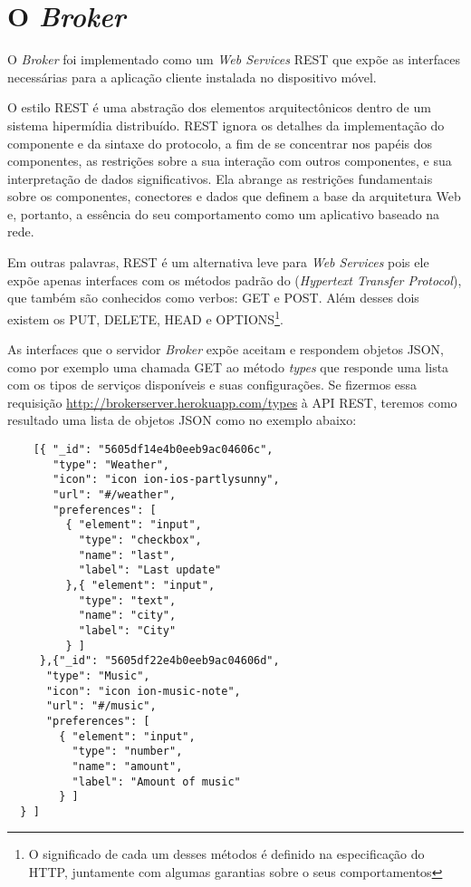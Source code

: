 \section{O \normalfont\itshape Broker}
O \textit{Broker} foi implementado como um \textit{Web Services} REST que expõe as interfaces necessárias para a aplicação cliente instalada no dispositivo móvel.
\begin{citacao}
O estilo REST é uma abstração dos elementos arquitectônicos dentro de um sistema hipermídia distribuído. REST ignora os detalhes da implementação do componente e da sintaxe do protocolo, a fim de se concentrar nos papéis dos componentes, as restrições sobre a sua interação com outros componentes, e sua interpretação de dados significativos. Ela abrange as restrições fundamentais sobre os componentes, conectores e dados que definem a base da arquitetura Web e, portanto, a essência do seu comportamento como um aplicativo baseado na rede. \cite{fielding2000architectural}
\end{citacao}
Em outras palavras, REST é um alternativa leve para \textit{Web Services} pois ele expõe apenas interfaces com os métodos padrão do  (\textit{Hypertext Transfer Protocol}), que também são conhecidos como verbos: GET e POST. Além desses dois existem os PUT, DELETE, HEAD e OPTIONS\footnote{O significado de cada um desses métodos é definido na especificação do HTTP, juntamente com algumas garantias sobre o seus comportamentos}.

As interfaces que o servidor \textit{Broker} expõe aceitam e respondem objetos JSON, como por exemplo uma chamada GET ao método \textit{types} que responde uma lista com os tipos de serviços disponíveis e suas configurações.
Se fizermos essa requisição \url{http://brokerserver.herokuapp.com/types} à API REST, teremos como resultado uma lista de objetos JSON como no exemplo abaixo:
\begin{footnotesize}
  \begin{verbatim}
    [{ "_id": "5605df14e4b0eeb9ac04606c",
       "type": "Weather",
       "icon": "icon ion-ios-partlysunny",
       "url": "#/weather",
       "preferences": [
         { "element": "input",
           "type": "checkbox",
           "name": "last",
           "label": "Last update"
         },{ "element": "input",
           "type": "text",
           "name": "city",
           "label": "City"
         } ]
     },{"_id": "5605df22e4b0eeb9ac04606d",
      "type": "Music",
      "icon": "icon ion-music-note",
      "url": "#/music",
      "preferences": [
        { "element": "input",
          "type": "number",
          "name": "amount",
          "label": "Amount of music"
        } ]
  } ]
  \end{verbatim}
\end{footnotesize}
\vspace{-7mm}

